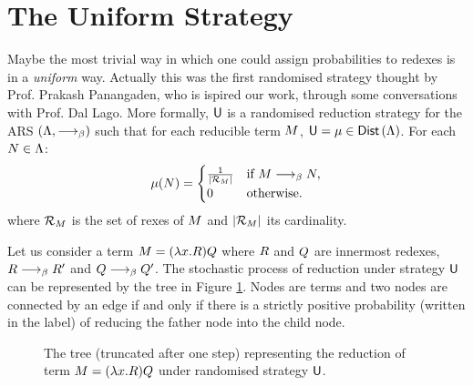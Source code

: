 \section{The Uniform Strategy}
Maybe the most trivial way in which one could assign probabilities to redexes is in a \emph{uniform} way. Actually this was the first randomised strategy thought by Prof. Prakash Panangaden, who is ispired our work, through some conversations with Prof. Dal Lago. More formally, $\mathsf{U}$ is a randomised reduction strategy for the ARS $(\Lambda,\longrightarrow_\beta)$ such that for each reducible term $M$, ${\mathsf{U}=\mu\in\textsf{Dist}\left(\Lambda\right)}$. For each $N\in\Lambda$:
$$
\mu(N)=\begin{cases}
\frac{1}{|\mathcal{R}_{M}|} & \text{if }M\longrightarrow_\beta N ,\\
0 & \text{otherwise}.\\
\end{cases}
$$
where $\mathcal{R}_{M}$ is the set of rexes of $M$ and $|\mathcal{R}_{M}|$ its cardinality.
\begin{example}
	Let us consider a term $M = (\lambda x.R)Q$
	where $R$ and $Q$ are innermost redexes,
	$R\longrightarrow_\beta R'$ and
	$Q\longrightarrow_\beta Q'$. The stochastic process of reduction under strategy $\mathsf{U}$ can be represented by the tree in Figure \ref{figure:unitree}. Nodes are terms and two nodes are connected by an edge if and only if there is a strictly positive probability (written in the label) of reducing the father node into the child node.
\end{example}
\begin{figure}
	\begin{center}
		\end{center}
	\caption{The tree (truncated after one step) representing the reduction of term $M = (\lambda x.R)Q$ under randomised strategy $\mathsf{U}$.}
	\label{figure:unitree}
\end{figure}
